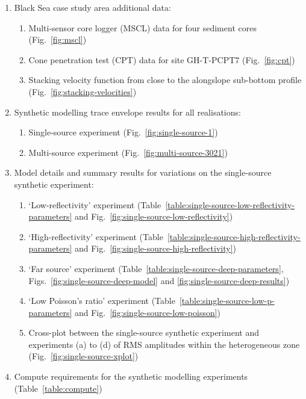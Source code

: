 \documentclass[se,manuscript]{copernicus}
\begin{document}
\begin{enumerate}
    \item Black Sea case study area additional data:
    \begin{enumerate}
        \item Multi-sensor core logger (MSCL) data for four sediment cores (Fig.~\ref{fig:mscl})
        \item Cone penetration test (CPT) data for site GH-T-PCPT7 (Fig.~\ref{fig:cpt})
        \item Stacking velocity function from close to the alongslope sub-bottom profile (Fig.~\ref{fig:stacking-velocities})
    \end{enumerate}
    \item Synthetic modelling trace envelope results for all realisations:
    \begin{enumerate}
        \item Single-source experiment (Fig.~\ref{fig:single-source-1})
        \item Multi-source experiment (Fig.~\ref{fig:multi-source-3021})
    \end{enumerate}
    \item Model details and summary results for variations on the single-source synthetic experiment:
    \begin{enumerate}
        \item `Low-reflectivity' experiment (Table~\ref{table:single-source-low-reflectivity-parameters} and Fig.~\ref{fig:single-source-low-reflectivity})
        \item `High-reflectivity' experiment (Table~\ref{table:single-source-high-reflectivity-parameters} and Fig.~\ref{fig:single-source-high-reflectivity})
        \item `Far source' experiment (Table~\ref{table:single-source-deep-parameters}, Figs.~\ref{fig:single-source-deep-model} and \ref{fig:single-source-deep-results})
        \item `Low Poisson's ratio' experiment (Table~\ref{table:single-source-low-p-parameters} and Fig.~\ref{fig:single-source-low-poisson})
        \item Cross-plot between the single-source synthetic experiment and experiments (a) to (d) 
        of RMS amplitudes within the heterogeneous zone (Fig.~\ref{fig:single-source-xplot})
    \end{enumerate}
    \item Compute requirements for the synthetic modelling experiments (Table~\ref{table:compute})
\end{enumerate}
\end{document}
